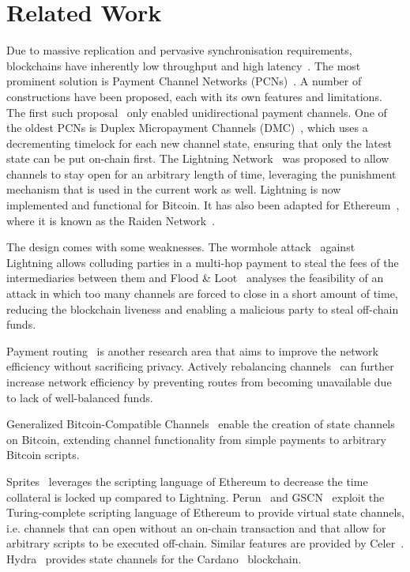 \section{Related Work}
  Due to massive replication and pervasive synchronisation requirements,
  blockchains have inherently low throughput and high latency~\cite{scaling}.
  The most prominent solution is Payment Channel Networks
  (PCNs)~\cite{DBLP:conf/fc/GudgeonMRMG20}. A number of constructions have been
  proposed, each with its own features and limitations. The first such
  proposal~\cite{spilman} only enabled unidirectional payment channels. One of
  the oldest PCNs is Duplex Micropayment Channels (DMC)~\cite{decker}, which
  uses a decrementing timelock for each new channel state, ensuring that only
  the latest state can be put on-chain first. The Lightning
  Network~\cite{lightning} was proposed to allow channels to stay open for an
  arbitrary length of time, leveraging the punishment mechanism that is used in
  the current work as well. Lightning is now implemented and functional for
  Bitcoin. It has also been adapted for Ethereum~\cite{wood2014ethereum}, where
  it is known as the Raiden Network~\cite{raiden}.

  The design comes with some weaknesses. The wormhole
  attack~\cite{DBLP:conf/ndss/MalavoltaMSKM19} against Lightning allows
  colluding parties in a multi-hop payment to steal the fees of the
  intermediaries between them and Flood \& Loot~\cite{10.1145/3419614.3423248}
  analyses the feasibility of an attack in which too many channels are forced to
  close in a short amount of time, reducing the blockchain liveness and enabling
  a malicious party to steal off-chain funds.

  Payment routing~\cite{spider,prihodko2016flare,lee2020routee} is another
  research area that aims to improve the network efficiency without sacrificing
  privacy. Actively rebalancing channels~\cite{DBLP:conf/ccs/KhalilG17} can
  further increase network efficiency by preventing routes from becoming
  unavailable due to lack of well-balanced funds.

  Generalized Bitcoin-Compatible
  Channels~\cite{cryptoeprint:2020:476} enable the creation of state channels on
  Bitcoin, extending channel functionality from simple payments to arbitrary
  Bitcoin scripts.

  Sprites~\cite{sprites} leverages the scripting language of Ethereum to
  decrease the time collateral is locked up compared to Lightning.
  Perun~\cite{perun} and GSCN~\cite{DBLP:conf/ccs/DziembowskiFH18} exploit the
  Turing-complete scripting language of Ethereum to provide virtual state
  channels, i.e. channels that can open without an on-chain transaction and that
  allow for arbitrary scripts to be executed off-chain. Similar features are
  provided by Celer~\cite{dong2018celer}. Hydra~\cite{cryptoeprint:2020:299}
  provides state channels for the Cardano~\cite{cardano} blockchain.

